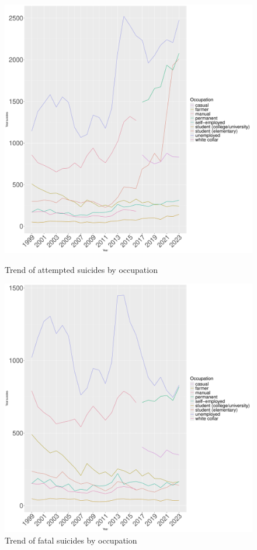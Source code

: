 \documentclass{article}
\begin{document}
\begin{figure}[H]
    \centering
    \begin{minipage}{0.65\textwidth}
        \includegraphics[width=\textwidth]{imgs/job_attempted.pdf}
        \caption{Trend of attempted suicides by occupation}
	\label{fig:job_attempted}
    \end{minipage}
    \hfill
    \begin{minipage}{0.65\textwidth}
        \includegraphics[width=\textwidth]{imgs/job_fatal.pdf}
        \caption{Trend of fatal suicides by occupation}
	\label{fig:job_fatal}
    \end{minipage}
\end{figure}
\end{document}
